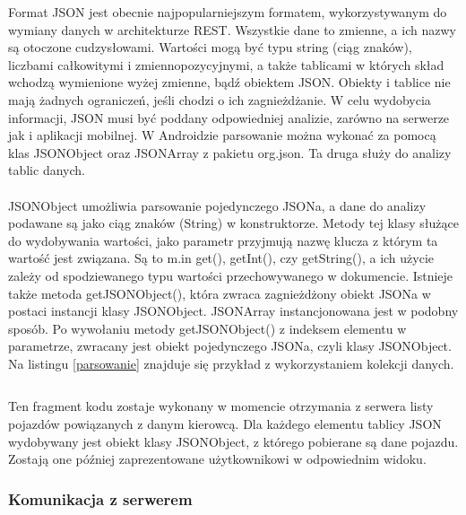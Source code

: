 Format JSON jest obecnie najpopularniejszym formatem, wykorzystywanym do wymiany danych w architekturze REST. Wszystkie dane to zmienne, a ich nazwy są otoczone cudzysłowami. Wartości mogą być typu string (ciąg znaków), liczbami całkowitymi i zmiennopozycyjnymi, a także tablicami w których skład wchodzą wymienione wyżej zmienne, bądź obiektem JSON. Obiekty i tablice nie mają żadnych ograniczeń, jeśli chodzi o ich zagnieżdżanie. W celu wydobycia informacji, JSON musi być poddany odpowiedniej analizie, zarówno na serwerze jak i aplikacji mobilnej. W Androidzie parsowanie można wykonać za pomocą klas JSONObject oraz JSONArray z pakietu org.json. Ta druga służy do analizy tablic danych. 
\\
\\
JSONObject umożliwia parsowanie pojedynczego JSONa, a dane do analizy podawane są jako ciąg znaków (String) w konstruktorze. Metody tej klasy służące do wydobywania wartości, jako parametr przyjmują nazwę klucza z którym ta wartość jest związana. Są to m.in get(), getInt(), czy getString(), a ich użycie zależy od spodziewanego typu wartości przechowywanego w dokumencie. Istnieje także metoda getJSONObject(), która zwraca zagnieżdżony obiekt JSONa w postaci instancji klasy JSONObject. JSONArray instancjonowana jest w podobny sposób. Po wywołaniu metody getJSONObject() z indeksem elementu w parametrze, zwracany jest obiekt pojedynczego JSONa, czyli klasy JSONObject. Na listingu \ref{parsowanie} znajduje się przykład z wykorzystaniem kolekcji danych.

\newpage

\begin{singlespace}
	\label{parsowanie}
	\vspace{0.3cm}
	\inputminted[fontsize=\footnotesize, linenos=true]{java}{src/imp/parsowanie-json.java}
\end{singlespace}

\vspace{0.3cm}

Ten fragment kodu zostaje wykonany w momencie otrzymania z serwera listy pojazdów powiązanych z danym kierowcą. Dla każdego elementu tablicy JSON wydobywany jest obiekt klasy JSONObject, z którego pobierane są dane pojazdu. Zostają one później zaprezentowane użytkownikowi w odpowiednim widoku.

\subsubsection*{Komunikacja z serwerem}

